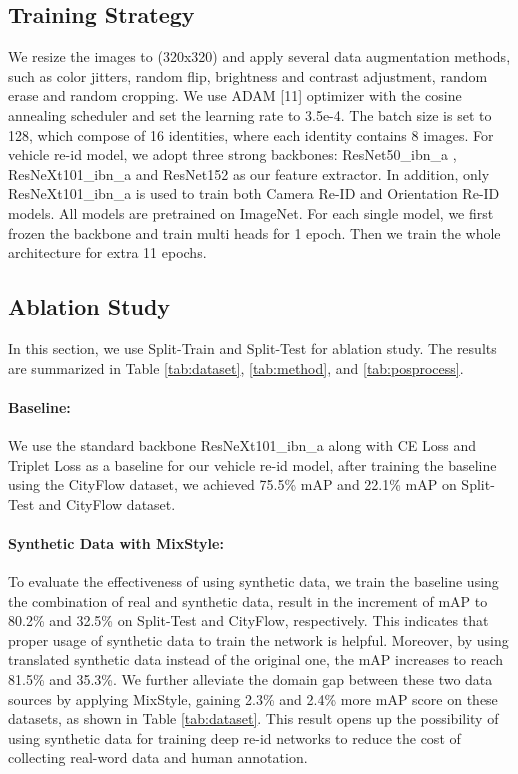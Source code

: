 \documentclass[10pt,twocolumn,letterpaper]{article}
\begin{document}
\subsection{Training Strategy}
We resize the images to (320x320) and apply several data augmentation methods, such as color jitters, random flip, brightness and contrast adjustment, random erase and random cropping. We use ADAM [11] optimizer with the cosine annealing scheduler and set the learning rate to 3.5e-4. The batch size is set to 128, which compose of 16 identities, where each identity contains 8 images. For vehicle re-id model, we adopt three strong backbones: ResNet50\_ibn\_a \cite{ibn}, ResNeXt101\_ibn\_a \cite{ibn} and ResNet152 \cite{resnet}  as our feature extractor. In addition, only ResNeXt101\_ibn\_a is used to train both Camera Re-ID and Orientation Re-ID models. All models are pretrained on ImageNet. For each single model, we first frozen the backbone and train multi heads for 1 epoch. Then we train the whole architecture for extra 11 epochs.
\subsection{Ablation Study}
In this section, we use Split-Train and Split-Test for ablation study. The results are summarized in Table \ref{tab:dataset}, \ref{tab:method}, and \ref{tab:posprocess}.

\paragraph{Baseline:} We use the standard backbone ResNeXt101\_ibn\_a \cite{ibn} along with CE Loss and Triplet Loss as a baseline for our vehicle re-id model, after training the baseline using the CityFlow dataset, we achieved 75.5\% mAP and 22.1\% mAP on Split-Test and CityFlow dataset.

\paragraph{Synthetic Data with MixStyle:} To evaluate the effectiveness of using synthetic data, we train the baseline using the combination of real and synthetic data, result in the increment of mAP to 80.2\% and 32.5\% on Split-Test and CityFlow, respectively. This indicates that proper usage of synthetic data to train the network is helpful. Moreover, by using translated synthetic data instead of the original one, the mAP increases to reach 81.5\% and 35.3\%. We further alleviate the domain gap between these two data sources by applying MixStyle, gaining 2.3\% and 2.4\% more mAP score on these datasets, as shown in Table \ref{tab:dataset}. This result opens up the possibility of using synthetic data for training deep re-id networks to reduce the cost of collecting real-word data and human annotation.
\end{document}
